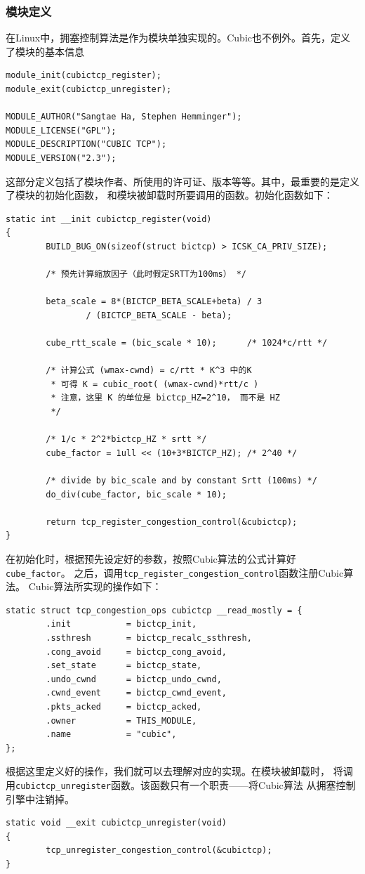 \subsubsection{模块定义}
在Linux中，拥塞控制算法是作为模块单独实现的。Cubic也不例外。首先，定义了模块的基本信息
\begin{verbatim}
module_init(cubictcp_register);
module_exit(cubictcp_unregister);

MODULE_AUTHOR("Sangtae Ha, Stephen Hemminger");
MODULE_LICENSE("GPL");
MODULE_DESCRIPTION("CUBIC TCP");
MODULE_VERSION("2.3");
\end{verbatim}
这部分定义包括了模块作者、所使用的许可证、版本等等。其中，最重要的是定义了模块的初始化函数，
和模块被卸载时所要调用的函数。初始化函数如下：
\begin{verbatim}
static int __init cubictcp_register(void)
{       
        BUILD_BUG_ON(sizeof(struct bictcp) > ICSK_CA_PRIV_SIZE);
        
        /* 预先计算缩放因子（此时假定SRTT为100ms） */
        
        beta_scale = 8*(BICTCP_BETA_SCALE+beta) / 3
                / (BICTCP_BETA_SCALE - beta);
        
        cube_rtt_scale = (bic_scale * 10);      /* 1024*c/rtt */
        
        /* 计算公式 (wmax-cwnd) = c/rtt * K^3 中的K
         * 可得 K = cubic_root( (wmax-cwnd)*rtt/c )
         * 注意，这里 K 的单位是 bictcp_HZ=2^10， 而不是 HZ
         */
        
        /* 1/c * 2^2*bictcp_HZ * srtt */
        cube_factor = 1ull << (10+3*BICTCP_HZ); /* 2^40 */
        
        /* divide by bic_scale and by constant Srtt (100ms) */
        do_div(cube_factor, bic_scale * 10);
        
        return tcp_register_congestion_control(&cubictcp);
}
\end{verbatim}
在初始化时，根据预先设定好的参数，按照Cubic算法的公式计算好\texttt{cube_factor}。
之后，调用\texttt{tcp_register_congestion_control}函数注册Cubic算法。
Cubic算法所实现的操作如下：
\begin{verbatim}
static struct tcp_congestion_ops cubictcp __read_mostly = {
        .init           = bictcp_init,
        .ssthresh       = bictcp_recalc_ssthresh,
        .cong_avoid     = bictcp_cong_avoid,
        .set_state      = bictcp_state,
        .undo_cwnd      = bictcp_undo_cwnd,
        .cwnd_event     = bictcp_cwnd_event,
        .pkts_acked     = bictcp_acked,
        .owner          = THIS_MODULE,
        .name           = "cubic",
};
\end{verbatim}
根据这里定义好的操作，我们就可以去理解对应的实现。在模块被卸载时，
将调用\texttt{cubictcp_unregister}函数。该函数只有一个职责——将Cubic算法
从拥塞控制引擎中注销掉。
\begin{verbatim}
static void __exit cubictcp_unregister(void)
{
        tcp_unregister_congestion_control(&cubictcp);
}
\end{verbatim}

